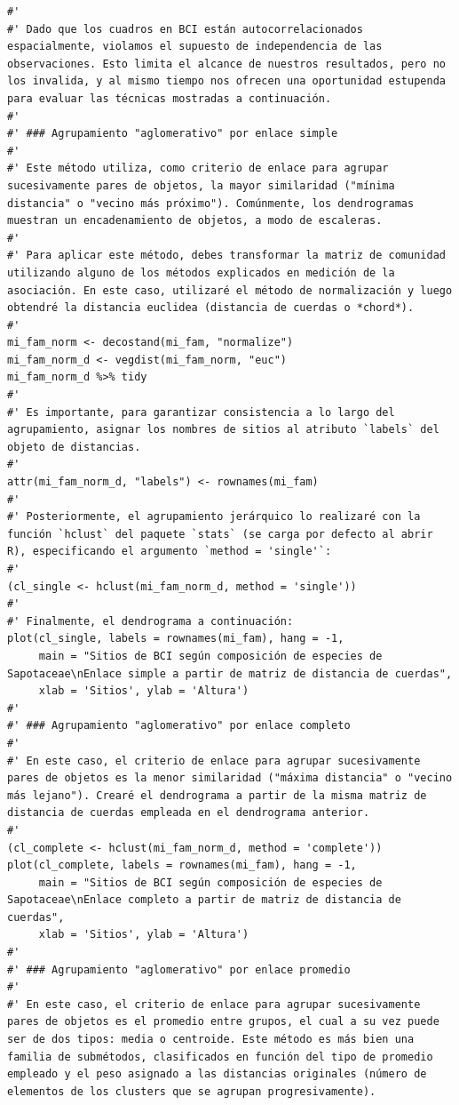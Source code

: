 \documentclass[11pt,]{article}
\begin{document}
\begin{verbatim}
#' 
#' Dado que los cuadros en BCI están autocorrelacionados espacialmente, violamos el supuesto de independencia de las observaciones. Esto limita el alcance de nuestros resultados, pero no los invalida, y al mismo tiempo nos ofrecen una oportunidad estupenda para evaluar las técnicas mostradas a continuación.
#' 
#' ### Agrupamiento "aglomerativo" por enlace simple
#' 
#' Este método utiliza, como criterio de enlace para agrupar sucesivamente pares de objetos, la mayor similaridad ("mínima distancia" o "vecino más próximo"). Comúnmente, los dendrogramas muestran un encadenamiento de objetos, a modo de escaleras.
#' 
#' Para aplicar este método, debes transformar la matriz de comunidad utilizando alguno de los métodos explicados en medición de la asociación. En este caso, utilizaré el método de normalización y luego obtendré la distancia euclidea (distancia de cuerdas o *chord*).
#' 
mi_fam_norm <- decostand(mi_fam, "normalize")
mi_fam_norm_d <- vegdist(mi_fam_norm, "euc")
mi_fam_norm_d %>% tidy
#'
#' Es importante, para garantizar consistencia a lo largo del agrupamiento, asignar los nombres de sitios al atributo `labels` del objeto de distancias.
#' 
attr(mi_fam_norm_d, "labels") <- rownames(mi_fam)
#' 
#' Posteriormente, el agrupamiento jerárquico lo realizaré con la función `hclust` del paquete `stats` (se carga por defecto al abrir R), especificando el argumento `method = 'single'`:
#' 
(cl_single <- hclust(mi_fam_norm_d, method = 'single'))
#' 
#' Finalmente, el dendrograma a continuación:
plot(cl_single, labels = rownames(mi_fam), hang = -1,
     main = "Sitios de BCI según composición de especies de Sapotaceae\nEnlace simple a partir de matriz de distancia de cuerdas",
     xlab = 'Sitios', ylab = 'Altura')
#' 
#' ### Agrupamiento "aglomerativo" por enlace completo
#' 
#' En este caso, el criterio de enlace para agrupar sucesivamente pares de objetos es la menor similaridad ("máxima distancia" o "vecino más lejano"). Crearé el dendrograma a partir de la misma matriz de distancia de cuerdas empleada en el dendrograma anterior.
#' 
(cl_complete <- hclust(mi_fam_norm_d, method = 'complete'))
plot(cl_complete, labels = rownames(mi_fam), hang = -1,
     main = "Sitios de BCI según composición de especies de Sapotaceae\nEnlace completo a partir de matriz de distancia de cuerdas",
     xlab = 'Sitios', ylab = 'Altura')
#' 
#' ### Agrupamiento "aglomerativo" por enlace promedio
#' 
#' En este caso, el criterio de enlace para agrupar sucesivamente pares de objetos es el promedio entre grupos, el cual a su vez puede ser de dos tipos: media o centroide. Este método es más bien una familia de submétodos, clasificados en función del tipo de promedio empleado y el peso asignado a las distancias originales (número de elementos de los clusters que se agrupan progresivamente).

\end{verbatim}
\end{document}

